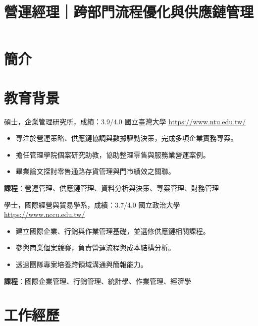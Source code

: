 \documentclass[a4paper, serif, 10pt]{moderncv}
\title{營運經理｜跨部門流程優化與供應鏈管理}
\begin{document}
\maketitle

\section{簡介}

\section{教育背景}

        {碩士，企業管理研究所，成績：3.9/4.0}
        {國立臺灣大學}
        {\url{https://www.ntu.edu.tw/}}
        {}
        {\begin{itemize}
\item 專注於營運策略、供應鏈協調與數據驅動決策，完成多項企業實務專案。
\item 擔任管理學院個案研究助教，協助整理零售與服務業營運案例。
\item 畢業論文探討零售通路存貨管理與門市績效之關聯。
\end{itemize}
\textbf{課程}：營運管理、供應鏈管理、資料分析與決策、專案管理、財務管理}

        {學士，國際經營與貿易學系，成績：3.7/4.0}
        {國立政治大學}
        {\url{https://www.nccu.edu.tw/}}
        {}
        {\begin{itemize}
\item 建立國際企業、行銷與作業管理基礎，並選修供應鏈相關課程。
\item 參與商業個案競賽，負責營運流程與成本結構分析。
\item 透過團隊專案培養跨領域溝通與簡報能力。
\end{itemize}
\textbf{課程}：國際企業管理、行銷管理、統計學、作業管理、經濟學}
\section{工作經歷}
\end{document}
